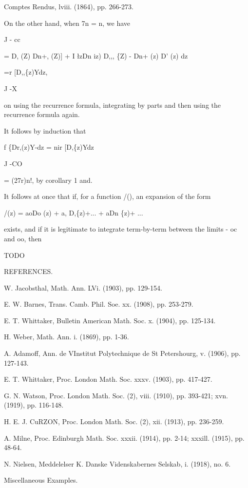 Comptes Rendus, lviii. (1864), pp. 266-273.

%
%

On the other hand, when 7n = n, we have

J - cc

= D, (Z) Dn+, (Z)] + I \l zDn iz) D,,, \{Z) - Dn+ (z) D' (z) dz

=r [D,,\{z)Ydz,

J -X

on using the recurrence formula, integrating by parts and then using
the recurrence formula again.

It follows by induction that

f \{Dr,(z)Y-dz = nir [D,\{z)Ydz

J -CO

= (27r)n!, by corollary 1 and.

It follows at once that if, for a function /(), an expansion of the
form

/(z) = aoDo (z) + a, D,\{z)+... + aDn \{z)+ ...

exists, and if it is legitimate to integrate term-by-term between the
limits - oc and oo, then

TODO

REFERENCES.

W. Jacobsthal, Math. Ann. LVi. (1903), pp. 129-154.

E. W. Barnes, Trans. Camb. Phil. Soe. xx. (1908), pp. 253-279.

E. T. Whittaker, Bulletin American Math. Soc. x. (1904), pp. 125-134.

H. Weber, Math. Ann. i. (1869), pp. 1-36.

A. Adamoff, Ann. de VInstitut Polytechnique de St Petershourg, v.
(1906), pp. 127-143.

E. T. Whittaker, Proc. London Math. Soc. xxxv. (1903), pp. 417-427.

G. N. Watson, Proc. London Math. Soc. (2), viii. (1910), pp. 393-421;
xvn. (1919), pp. 116-148.

H. E. J. CuRZON, Proc. London Math. Soc. (2), xii. (1913), pp.
236-259.

A. Milne, Proc. Edinburgh Math. Soc. xxxii. (1914), pp. 2-14; xxxill.
(1915), pp. 48-64.

N. Nielsen, Meddelelser K. Danske Videnskabernes Selskab, i. (1918),
no. 6.

%
%

Miscellaneous Examples.

